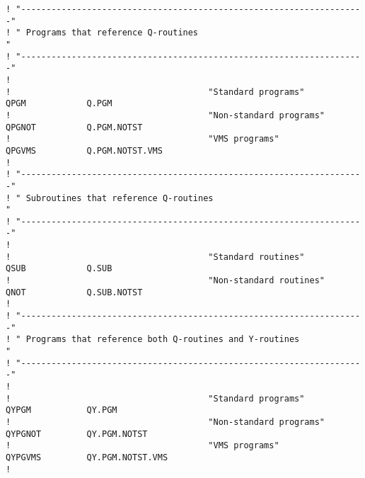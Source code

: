 \begin{verbatim}
! "--------------------------------------------------------------------"
! " Programs that reference Q-routines                                 "
! "--------------------------------------------------------------------"
!
!                                       "Standard programs"
QPGM            Q.PGM
!                                       "Non-standard programs"
QPGNOT          Q.PGM.NOTST
!                                       "VMS programs"
QPGVMS          Q.PGM.NOTST.VMS
!
! "--------------------------------------------------------------------"
! " Subroutines that reference Q-routines                              "
! "--------------------------------------------------------------------"
!
!                                       "Standard routines"
QSUB            Q.SUB
!                                       "Non-standard routines"
QNOT            Q.SUB.NOTST
!
! "--------------------------------------------------------------------"
! " Programs that reference both Q-routines and Y-routines             "
! "--------------------------------------------------------------------"
!
!                                       "Standard programs"
QYPGM           QY.PGM
!                                       "Non-standard programs"
QYPGNOT         QY.PGM.NOTST
!                                       "VMS programs"
QYPGVMS         QY.PGM.NOTST.VMS
!
\end{verbatim}

